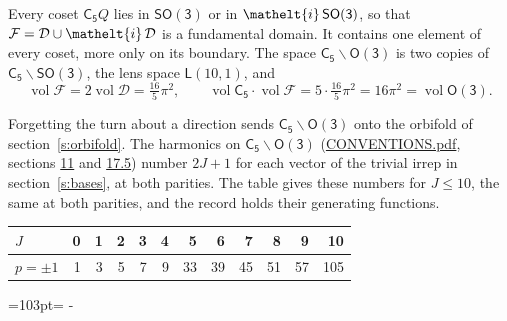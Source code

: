 \documentclass[10pt,a4paper]{article}
\newcommand{\needspace}[1]{\par\penalty-100\begingroup\dimen0=#1\relax\dimen2=\pagegoal
  \advance\dimen2-\pagetotal\ifdim\dimen0>\dimen2\relax\ifdim\dimen2>0pt\vfil\break\fi\fi
  \endgroup}
\numberwithin{equation}{section}
\newcommand{\eltfont}[1]{{\let\sigma\eltsigma\mathelt{#1}}}
\newcommand{\grp}[1]{\mathsf{#1}}
\newcommand{\elt}[1]{\eltfont{#1}}
\newcommand{\vol}{\operatorname{vol}}
\newcommand{\fcell}{\mathcal{D}}
\newcommand{\fdomain}{\mathcal{F}}
\newcommand{\lensspace}[2]{\mathsf{L}(#1, #2)}
\begin{document}
\leavevmode\label{n:set.fundamental}Every coset $\grp{C_{5}}Q$ lies in \href{SO3.pdf}{$\grp{SO(3)}$} or in $\elt{i}\,\grp{SO(3)}$, so that $\fdomain = \fcell \cup \elt{i}\,\fcell$ is a fundamental domain. It contains one element of every coset, more only on its boundary.
\leavevmode\label{n:set.lens}The space $\grp{C_{5}}\backslash\grp{O(3)}$ is two copies of $\grp{C_{5}}\backslash\grp{SO(3)}$, the lens space $\lensspace{10}{1}$, and
\begin{equation}\label{e:volume}\vol\fdomain = 2\vol\fcell = \tfrac{16}{5}\pi^2,\qquad \vol\grp{C_{5}}\cdot\vol\fdomain = 5\cdot \tfrac{16}{5}\pi^2 = 16\pi^2 = \vol\grp{O(3)}.\end{equation}

Forgetting the turn about a direction sends $\grp{C_{5}}\backslash\grp{O(3)}$ onto the orbifold of section~\ref{s:orbifold}.
The harmonics on $\grp{C_{5}}\backslash\grp{O(3)}$ (\href{../../CONVENTIONS.pdf}{CONVENTIONS.pdf}, sections \href{../../CONVENTIONS.pdf\#conv.11}{11} and \href{../../CONVENTIONS.pdf\#conv.17.5}{17.5}) number $2J + 1$ for each vector of the trivial irrep in section~\ref{s:bases}, at both parities. The table gives these numbers for $J \le 10$, the same at both parities, and the record holds their generating functions.
{\small\setlength{\tabcolsep}{4pt}\begin{longtable}{@{}lrrrrrrrrrrr@{}}\toprule
$J$ & 0 & 1 & 2 & 3 & 4 & 5 & 6 & 7 & 8 & 9 & 10\\\midrule\endhead
\bottomrule\endfoot\endlastfoot
$p = \pm 1$ & 1 & 3 & 5 & 7 & 9 & 33 & 39 & 45 & 51 & 57 & 105\\
\bottomrule\end{longtable}}
\needspace{103pt}
\end{document}

